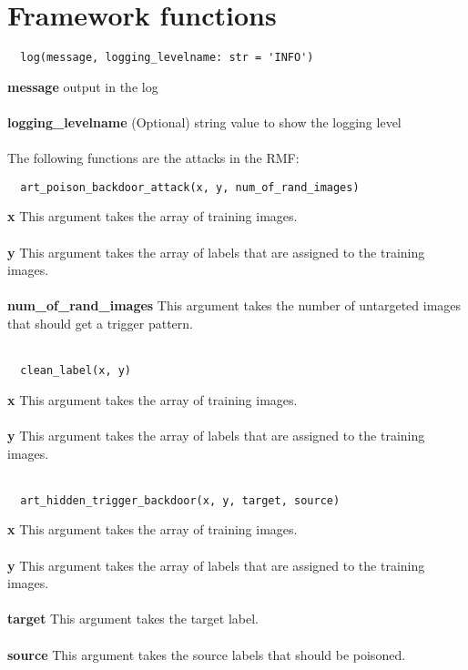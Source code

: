 \section{Framework functions}
\label{sec:frame_func}

\begin{lstlisting}
  log(message, logging_levelname: str = 'INFO')
\end{lstlisting}

\noindent\textbf{message}
output in the log \\ \\
\textbf{logging\_levelname}
(Optional) string value to show the logging level \\ \\

The following functions are the attacks in the RMF: \\

\begin{lstlisting}
  art_poison_backdoor_attack(x, y, num_of_rand_images)
\end{lstlisting}

\noindent\textbf{x}
This argument takes the array of training images. \\ \\
\textbf{y}
This argument takes the array of labels that are assigned to the training images. \\ \\
\textbf{num\_of\_rand\_images}
This argument takes the number of untargeted images that should get a trigger pattern. \\ \\

\begin{lstlisting}
  clean_label(x, y)
\end{lstlisting}

\noindent\textbf{x}
This argument takes the array of training images. \\ \\
\textbf{y}
This argument takes the array of labels that are assigned to the training images. \\ \\

\begin{lstlisting}
  art_hidden_trigger_backdoor(x, y, target, source)
\end{lstlisting}

\noindent\textbf{x}
This argument takes the array of training images. \\ \\
\textbf{y}
This argument takes the array of labels that are assigned to the training images. \\ \\
\textbf{target}
This argument takes the target label. \\ \\
\textbf{source}
This argument takes the source labels that should be poisoned.

